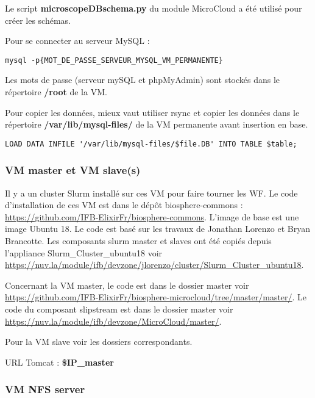 Le script \textbf{microscopeDBschema.py} du module MicroCloud a été utilisé pour créer les schémas.
\newline

Pour se connecter au serveur MySQL :
\begin{lstlisting}[style=bash]
mysql -p{MOT_DE_PASSE_SERVEUR_MYSQL_VM_PERMANENTE}
\end{lstlisting}

Les mots de passe (serveur mySQL et phpMyAdmin) sont stockés dans le répertoire \textbf{/root} de la VM.
\newline 

Pour copier les données, mieux vaut utiliser rsync et copier les données dans le répertoire \textbf{/var/lib/mysql-files/} de la VM permanente avant insertion en base.

\begin{lstlisting}[style=bash]
LOAD DATA INFILE '/var/lib/mysql-files/$file.DB' INTO TABLE $table;
\end{lstlisting}

\subsubsection{VM master et VM slave(s)} \label{master&slave}

Il y a un cluster Slurm installé sur ces VM pour faire tourner les WF. Le code d’installation de ces VM est dans le dépôt biosphere-commons : \url{https://github.com/IFB-ElixirFr/biosphere-commons}.
L'image de base est une image Ubuntu 18.
Le code est basé sur les travaux de Jonathan Lorenzo et Bryan Brancotte.
Les composants slurm master et slaves ont été copiés depuis l'appliance Slurm\_Cluster\_ubuntu18 voir \url{https://nuv.la/module/ifb/devzone/jlorenzo/cluster/Slurm_Cluster_ubuntu18}.

Concernant la VM master, le code est dans le dossier master voir
\url{https://github.com/IFB-ElixirFr/biosphere-microcloud/tree/master/master/}.
Le code du composant slipstream est dans le dossier master voir \url{https://nuv.la/module/ifb/devzone/MicroCloud/master/}.

Pour la VM slave voir les dossiers correspondants.\newline

URL Tomcat : \textbf{\$IP\_master}

\subsubsection{VM NFS server} \label{nfsserver}

